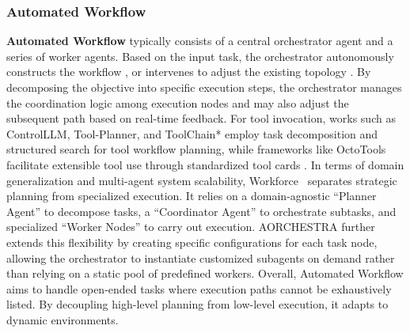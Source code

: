 \subsubsection{Automated Workflow}
\label{sec:automated_workflow}
\textbf{Automated Workflow} typically consists of a central orchestrator agent and a series of worker agents. Based on the input task, the orchestrator autonomously constructs the workflow \cite{HuggingGPT, Mindsearch, Cognitive_Kernel_Pro}, or intervenes to adjust the existing topology \cite{PLAN_AND_ACT, Agent_e,Webpilot}. By decomposing the objective into specific execution steps, the orchestrator manages the coordination logic among execution nodes and may also adjust the subsequent path based on real-time feedback. For tool invocation, works such as ControlLLM, Tool-Planner, and ToolChain* employ task decomposition and structured search for tool workflow planning, while frameworks like OctoTools facilitate extensible tool use through standardized tool cards \cite{ControlLLM,ToolPlanner,ToolChainStar,OctoTools}. In terms of domain generalization and multi-agent system scalability, Workforce~\cite{OWL} separates strategic planning from specialized execution. It relies on a domain-agnostic ``Planner Agent'' to decompose tasks, a ``Coordinator Agent'' to orchestrate subtasks, and specialized ``Worker Nodes'' to carry out execution. AORCHESTRA \cite{AORCHESTRA} further extends this flexibility by creating specific configurations for each task node, allowing the orchestrator to instantiate customized subagents on demand rather than relying on a static pool of predefined workers. Overall, Automated Workflow aims to handle open-ended tasks where execution paths cannot be exhaustively listed. By decoupling high-level planning from low-level execution, it adapts to dynamic environments.

